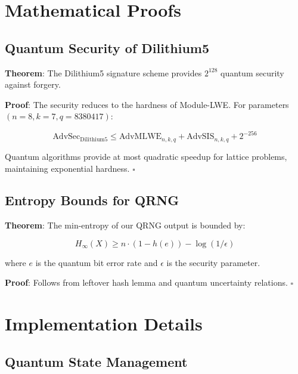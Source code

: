 \documentclass[11pt,a4paper]{article}
\begin{document}
\appendix

\section{Mathematical Proofs}

\subsection{Quantum Security of Dilithium5}

\textbf{Theorem}: The Dilithium5 signature scheme provides $2^{128}$ quantum security against forgery.

\textbf{Proof}: The security reduces to the hardness of Module-LWE. For parameters $(n=8, k=7, q=8380417)$:

\begin{equation}
\text{AdvSec}_{\text{Dilithium5}} \leq \text{AdvMLWE}_{n,k,q} + \text{AdvSIS}_{n,k,q} + 2^{-256}
\end{equation}

Quantum algorithms provide at most quadratic speedup for lattice problems, maintaining exponential hardness. $\square$

\subsection{Entropy Bounds for QRNG}

\textbf{Theorem}: The min-entropy of our QRNG output is bounded by:

\begin{equation}
H_{\infty}(X) \geq n \cdot (1 - h(e)) - \log(1/\epsilon)
\end{equation}

where $e$ is the quantum bit error rate and $\epsilon$ is the security parameter.

\textbf{Proof}: Follows from leftover hash lemma and quantum uncertainty relations. $\square$

\section{Implementation Details}

\subsection{Quantum State Management}
\end{document}
